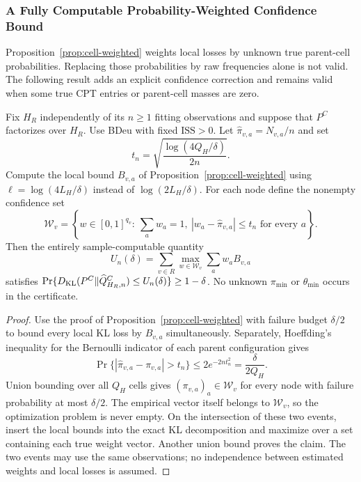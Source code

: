 \subsubsection{A Fully Computable Probability-Weighted Confidence Bound}
\label{subsubsec:empirical-weighted}
Proposition~\ref{prop:cell-weighted} weights local losses by unknown true
parent-cell probabilities. Replacing those probabilities by raw frequencies
alone is not valid. The following result adds an explicit confidence
correction and remains valid when some true CPT entries or parent-cell
masses are zero.

\begin{theorem}
\label{thm:empirical-certificate}
Fix $H_R$ independently of its $n\geq1$ fitting observations and suppose
that $P^C$ factorizes over $H_R$. Use BDeu with fixed $\mathrm{ISS}>0$.
Let $\widehat\pi_{v,a}=N_{v,a}/n$ and set
\[
t_n=\sqrt{\frac{\log(4Q_H/\delta)}{2n}}.
\]
Compute the local bound $B_{v,a}$ of
Proposition~\ref{prop:cell-weighted} using
$\ell=\log(4L_H/\delta)$ instead of $\log(2L_H/\delta)$.
For each node define the nonempty confidence set
\[
\mathcal W_v=
\left\{w\in[0,1]^{q_v}:\ \sum_a w_a=1,\
 |w_a-\widehat\pi_{v,a}|\leq t_n\text{ for every }a\right\}.
\]
Then the entirely sample-computable quantity
\begin{equation}
U_n(\delta)=\sum_{v\in R}\max_{w\in\mathcal W_v}
                 \sum_a w_a B_{v,a}
\label{eq:empirical-certificate}
\end{equation}
satisfies
$\Pr\{D_{\rm KL}(P^C\Vert\widehat Q_{H_R,n}^C)\leq U_n(\delta)\}
\geq1-\delta$. No unknown $\pi_{\min}$ or $\theta_{\min}$ occurs in
the certificate.
\end{theorem}
\begin{proof}
Use the proof of Proposition~\ref{prop:cell-weighted} with failure
budget $\delta/2$ to bound every local KL loss by $B_{v,a}$
simultaneously. Separately, Hoeffding's inequality for the Bernoulli
indicator of each parent configuration gives
\[
\Pr\{|\widehat\pi_{v,a}-\pi_{v,a}|>t_n\}
\leq 2e^{-2nt_n^2}=\frac{\delta}{2Q_H}.
\]
Union bounding over all $Q_H$ cells gives
$(\pi_{v,a})_a\in\mathcal W_v$ for every node with failure probability
at most $\delta/2$. The empirical vector itself belongs to
$\mathcal W_v$, so the optimization problem is never empty.
On the intersection of these two events, insert the local bounds into
the exact KL decomposition and maximize over a set containing each
true weight vector. Another union bound proves the claim.
The two events may use the same observations; no independence between
estimated weights and local losses is assumed.
\end{proof}

